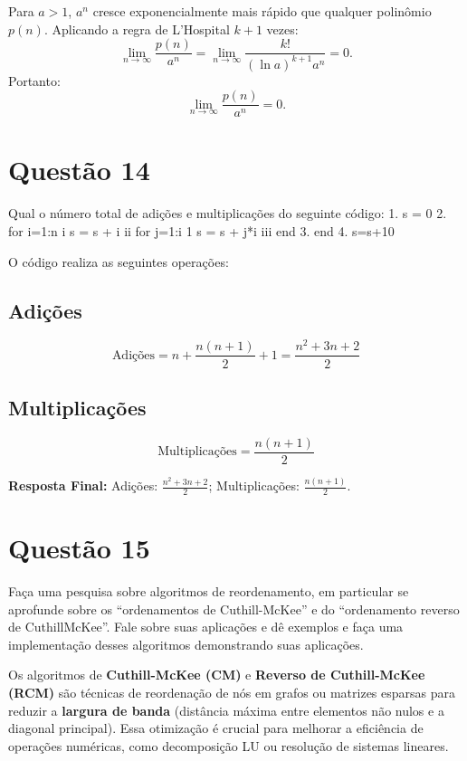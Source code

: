 Para \( a > 1 \), \( a^n \) cresce exponencialmente mais rápido que qualquer polinômio \( p(n) \). Aplicando a regra de L’Hospital \( k+1 \) vezes:
\[
\lim_{n \to \infty} \frac{p(n)}{a^n} = \lim_{n \to \infty} \frac{k!}{(\ln a)^{k+1}a^n} = 0.
\]
Portanto:
\[
\boxed{\lim_{n \to \infty} \frac{p(n)}{a^n} = 0}.
\]

\section*{Questão 14}

Qual o número total de adições e multiplicações do seguinte código:
        1.             s = 0
2.             for i=1:n
   i                  s = s + i
   ii                 for j=1:i
                          1 s = s + j*i
   iii           end
3.          end
4.          s=s+10

\vspace{10pt}

O código realiza as seguintes operações:

\subsection*{Adições}
\[
\text{Adições} = n + \frac{n(n+1)}{2} + 1 = \frac{n^2 + 3n + 2}{2}
\]

\subsection*{Multiplicações}
\[
\text{Multiplicações} = \frac{n(n+1)}{2}
\]

\textbf{Resposta Final:}  
Adições: \(\boxed{\frac{n^2 + 3n + 2}{2}}\);  
Multiplicações: \(\boxed{\frac{n(n+1)}{2}}\).

\section*{Questão 15}
Faça uma pesquisa sobre algoritmos de reordenamento, em particular se aprofunde sobre os “ordenamentos de Cuthill-McKee” e do “ordenamento reverso de CuthillMcKee”. Fale sobre suas aplicações e dê exemplos e faça uma implementação desses algoritmos demonstrando suas aplicações.

Os algoritmos de \textbf{Cuthill-McKee (CM)} e \textbf{Reverso de Cuthill-McKee (RCM)} são técnicas de reordenação de nós em grafos ou matrizes esparsas para reduzir a \textbf{largura de banda} (distância máxima entre elementos não nulos e a diagonal principal). Essa otimização é crucial para melhorar a eficiência de operações numéricas, como decomposição LU ou resolução de sistemas lineares.


